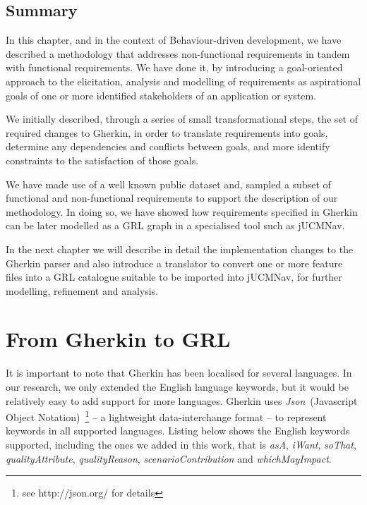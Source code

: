\documentclass[dissertation,final]{softeng}
\newcommand{\nfrs}{non-functional requirements\xspace}
\begin{document}
\section{Summary}
In this chapter, and in the context of Behaviour-driven development, we have described a methodology that addresses \nfrs in tandem with functional requirements. We have done it, by introducing a goal-oriented approach to the elicitation, analysis and modelling of requirements as aspirational goals of one or more identified stakeholders of an application or system.

We initially described, through a series of small transformational steps, the set of required changes to Gherkin, in order to translate requirements into goals, determine any dependencies and conflicts between goals, and more identify constraints to the satisfaction of those goals.

We have made use of a well known public dataset and, sampled a subset of functional and non-functional requirements to support the description of our methodology. In doing so, we have showed how requirements specified in Gherkin can be later modelled as a GRL graph in a specialised tool such as jUCMNav.

In the next chapter we will describe in detail the implementation changes to the Gherkin parser and also introduce a translator to convert one or more feature files into a GRL catalogue suitable to be imported into jUCMNav, for further modelling, refinement and analysis.

\chapter{From Gherkin to GRL}
\label{ch:gherkin_redux}

It is important to note that Gherkin has been localised for several languages. In our research, we only extended the English language keywords, but it would be relatively easy to add support for more languages. Gherkin uses \emph{Json}~(Javascript Object Notation)~\footnote{see http://json.org/ for details} -- a lightweight data-interchange format -- to represent keywords in all supported languages. Listing below shows the English keywords supported, including the ones we added in this work, that is \emph{asA}, \emph{iWant}, \emph{soThat}, \emph{qualityAttribute}, \emph{qualityReason}, \emph{scenarioContribution} and \emph{whichMayImpact}.
\end{document}
